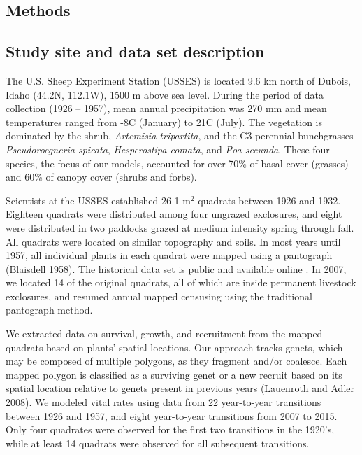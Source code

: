 \documentclass[11pt]{article}
\begin{document}
\begin{doublespacing}
\section*{Methods}

\subsection*{Study site and data set description}

The U.S. Sheep Experiment Station (USSES) is located 9.6 km north of Dubois, Idaho (44.2\degree N, 112.1\degree W), 1500 m above sea level. During the period of data collection (1926 – 1957), mean annual precipitation was 270 mm and mean temperatures ranged from -8\degree C (January) to 21\degree C (July). The vegetation is dominated by the shrub, \textit{Artemisia tripartita}, and the C3  perennial bunchgrasses \textit{Pseudoroegneria spicata}, \textit{Hesperostipa comata}, and \textit{Poa secunda}. These four species, the focus of our models, accounted for over 70\% of basal cover (grasses) and 60\% of canopy cover (shrubs and forbs). 

Scientists at the USSES established 26 1-m$^2$ quadrats between 1926 and 1932. Eighteen quadrats were distributed among four ungrazed exclosures, and eight were distributed in two paddocks grazed at medium intensity spring through fall. All quadrats were located on similar topography and soils. In most years until 1957, all individual plants in each quadrat were mapped using a pantograph (Blaisdell 1958). The historical data set is public and available online \citep*{zachmann-etal-2010}. In 2007, we located 14 of the original quadrats, all of which are inside permanent livestock exclosures, and resumed annual mapped censusing using the traditional pantograph method. 

We extracted data on survival, growth, and recruitment from the mapped quadrats based on plants' spatial locations. Our approach tracks genets, which may be composed of multiple polygons, as they fragment and/or coalesce. Each mapped polygon is classified as a surviving genet or a new recruit based on its spatial location relative to genets present in previous years (Lauenroth and Adler 2008). We modeled vital rates using data from 22 year-to-year transitions between 1926 and 1957, and eight year-to-year transitions from 2007 to 2015. Only four quadrates were observed for the first two transitions in the 1920's, while at least 14 quadrats were observed for all subsequent transitions. 


\end{doublespacing}
\end{document}
